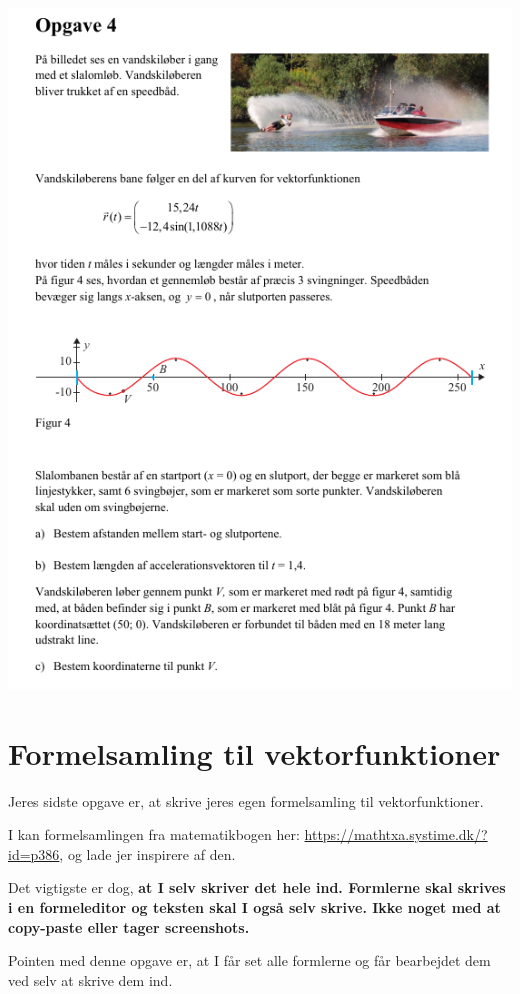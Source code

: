 \documentclass[a4paper, 12pt]{article}
\begin{document}
\begin{center}
\includegraphics[width=.9\linewidth]{img/opg5.png}
\end{center}


\newpage
\section*{Formelsamling til vektorfunktioner}
\label{sec:org1f9e214}

Jeres sidste opgave er, at skrive jeres egen formelsamling til vektorfunktioner.

I kan formelsamlingen fra matematikbogen her: \url{https://mathtxa.systime.dk/?id=p386}, og lade jer inspirere af den.

Det vigtigste er dog, \textbf{at I selv skriver det hele ind. Formlerne skal skrives i en formeleditor og teksten skal I også selv skrive. Ikke noget med at copy-paste eller tager screenshots.}

Pointen med denne opgave er, at I får set alle formlerne og får bearbejdet dem ved selv at skrive dem ind.
\end{document}
